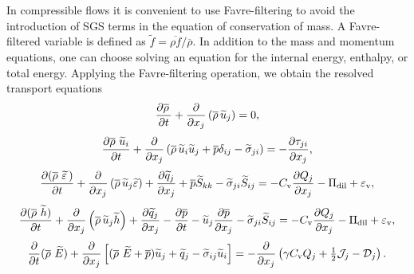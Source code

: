 \documentclass[tcfd]{svjour}
\begin{document}
In compressible f\/lows it is convenient to use Favre-f\/iltering
\citep[b]{fav65a} to avoid the introduction of SGS
terms in the equation of conservation of mass. A Favre-f\/iltered
variable is def\/ined as $\widetilde{f}=\overline{\rho
f}/\overline{\rho}$. In addition to the mass and momentum
equations, one can choose solving an equation for the internal energy,
enthalpy, or total energy. Applying the Favre-f\/iltering operation, we
obtain the resolved transport equations
\begin{equation}
 \label{eq:mass-ff}
 \frac{\partial\overline{\rho}\,}{\partial t}
 + \frac{\partial}{\partial x_{j}} \left(\overline{\rho}\,\widetilde{u}_j\right)
 = 0 ,
\end{equation}
\begin{equation}
 \label{eq:mom-ff}
 \frac{\partial\overline{\rho}\,\,\widetilde{u}_i}{\partial t}
 + \frac{\partial}{\partial x_{j}}\left(\overline{\rho}\,\widetilde{u}_i\widetilde{u}_j
 + \overline{p} \delta_{ij} - \widetilde{\sigma}_{ji} \right)
 = - \frac{\partial\tau_{ji}}{\partial x_{j}} ,
\end{equation}
\begin{equation}
 \label{eq:int-en-ff}
 \frac{\partial (\overline{\rho}\,\,\widetilde{\varepsilon}\,)}{\partial t}
 + \frac{\partial}{\partial x_{j}}
 \left(\overline{\rho}\,\widetilde{u}_j\widetilde\varepsilon\right)
 + \frac{\partial\widetilde{q}_j}{\partial x_j}
 + \overline{p}\widetilde{S}_{kk} - \widetilde{\sigma}_{ji}\widetilde{S}_{ij}
 = - C_{\rm v}\frac{\partial Q_j}{\partial x_{j}} - \Pi_{\rm dil} +
 \varepsilon_{\rm v} ,
\end{equation}
\begin{equation}
 \label{eq:enth-ff}
 \frac{\partial (\overline{\rho}\,\,\widetilde{h})}{\partial t}
 + \frac{\partial}{\partial x_j}\left(\overline{\rho}\,\widetilde{u}_j\widetilde{h}\right)
 + \frac{\partial\widetilde{q}_j}{\partial x_j}
 - \frac{\partial\overline{p}}{\partial t}
 - \widetilde{u}_j\frac{\partial\overline{p}}{\partial x_j}
 - \widetilde{\sigma}_{ji}\widetilde{S}_{ij} =
 - C_{\rm v}\frac{\partial Q_j}{\partial x_j}
 - \Pi_{\rm dil}
 + \varepsilon_{\rm v} ,
\end{equation}
\begin{equation}
 \label{eq:tot-en-ff}
 \frac{\partial}{\partial t} (\rhob\,\Etil)
 + \frac{\partial}{\partial x_j}
 \left[(\rhob\,\Etil + \pb)\util_j + \widetilde{q}_j
 - \widetilde{\sigma}_{ij}\util_i \right] =
 - \frac{\partial}{\partial x_j}\left(\gamma C_{\rm v}Q_j
 + {\textstyle\half}{\cal J}_j
 - {\cal D}_j \right) .
\end{equation}
\end{document}
